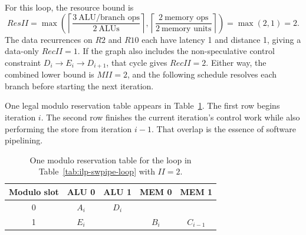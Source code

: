 For this loop, the resource bound is
\[
    ResII=\max\!\left(\left\lceil \frac{3\ \text{ALU/branch ops}}{2\ \text{ALUs}} \right\rceil,
                    \left\lceil \frac{2\ \text{memory ops}}{2\ \text{memory units}} \right\rceil \right)=\max(2,1)=2.
\]
The data recurrences on $R2$ and $R10$ each have latency 1 and distance 1, giving a data-only $RecII=1$.
If the graph also includes the non-speculative control constraint $D_i\rightarrow E_i\rightarrow D_{i+1}$, that cycle gives $RecII=2$.
Either way, the combined lower bound is $MII=2$, and the following schedule resolves each branch before starting the next iteration.

One legal modulo reservation table appears in Table~\ref{tab:ilp-swpipe-kernel}.
The first row begins iteration $i$.
The second row finishes the current iteration's control work while also performing the store from iteration $i-1$.
That overlap is the essence of software pipelining.
\begin{table}[t]
    \centering
    \renewcommand{\arraystretch}{1.15}
    \begin{tabular}{|c|c|c|c|c|}
        \hline
        Modulo slot & ALU 0 & ALU 1 & MEM 0 & MEM 1     \\
        \hline
        0           & $A_i$ & $D_i$ &       &           \\
        \hline
        1           & $E_i$ &       & $B_i$ & $C_{i-1}$ \\
        \hline
    \end{tabular}
    \caption{One modulo reservation table for the loop in Table~\ref{tab:ilp-swpipe-loop} with $II=2$.}
    \label{tab:ilp-swpipe-kernel}
\end{table}

